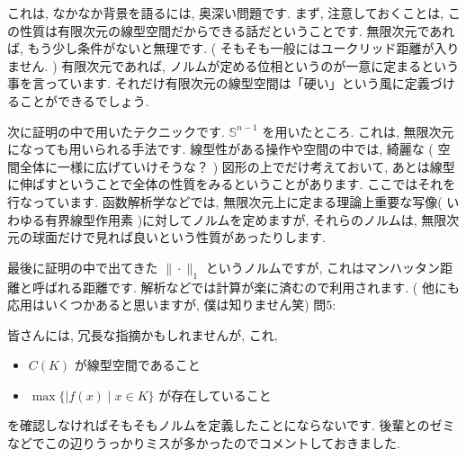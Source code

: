 \documentclass[dvipdfmx,uplatex,11pt]{jsarticle}
\begin{document}
これは, なかなか背景を語るには, 奥深い問題です. まず, 注意しておくことは, この性質は有限次元の線型空間だからできる話だということです. 無限次元であれば, もう少し条件がないと無理です. ( そもそも一般にはユークリッド距離が入りません. ) 有限次元であれば, ノルムが定める位相というのが一意に定まるという事を言っています. それだけ有限次元の線型空間は「硬い」という風に定義づけることができるでしょう. \par
次に証明の中で用いたテクニックです.  $\mathbb S^{n-1}$ を用いたところ. これは, 無限次元になっても用いられる手法です. 線型性がある操作や空間の中では, 綺麗な ( 空間全体に一様に広げていけそうな？ ) 図形の上でだけ考えておいて, あとは線型に伸ばすということで全体の性質をみるということがあります. ここではそれを行なっています. 函数解析学などでは, 無限次元上に定まる理論上重要な写像( いわゆる有界線型作用素 )に対してノルムを定めますが, それらのノルムは, 無限次元の球面だけで見れば良いという性質があったりします. \par
最後に証明の中で出てきた $\| \cdot \| _ 1$ というノルムですが, これはマンハッタン距離と呼ばれる距離です. 解析などでは計算が楽に済むので利用されます. ( 他にも応用はいくつかあると思いますが, 僕は知りません笑)
\newpage
問5:\par 
皆さんには, 冗長な指摘かもしれませんが, これ, 
	\begin{itemize}
		\item $C ( K )$ が線型空間であること
		\item $\max \{ | f ( x ) \mid x \in K \}$ が存在していること
\end{itemize}
を確認しなければそもそもノルムを定義したことにならないです. 後輩とのゼミなどでこの辺りうっかりミスが多かったのでコメントしておきました. \\
\dotfill
\end{document}

